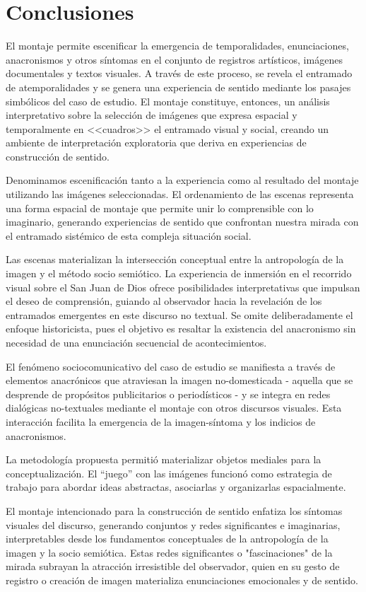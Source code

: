 \section{Conclusiones}

El montaje permite escenificar la emergencia de temporalidades, enunciaciones, anacronismos y otros síntomas en el conjunto de registros artísticos, imágenes documentales y textos visuales. A través de este proceso, se revela el entramado de atemporalidades y se genera una experiencia de sentido mediante los pasajes simbólicos del caso de estudio. El montaje constituye, entonces, un análisis interpretativo sobre la selección de imágenes que expresa espacial y temporalmente en <<cuadros>> el entramado visual y social, creando un ambiente de interpretación exploratoria que deriva en experiencias de construcción de sentido.

Denominamos escenificación tanto a la experiencia como al resultado del montaje utilizando las imágenes seleccionadas. El ordenamiento de las escenas representa una forma espacial de montaje que permite unir lo comprensible con lo imaginario, generando experiencias de sentido que confrontan nuestra mirada con el entramado sistémico de esta compleja situación social.

Las escenas materializan la intersección conceptual entre la antropología de la imagen y el método socio semiótico. La experiencia de inmersión en el recorrido visual sobre el San Juan de Dios ofrece posibilidades interpretativas que impulsan el deseo de comprensión, guiando al observador hacia la revelación de los entramados emergentes en este discurso no textual. Se omite deliberadamente el enfoque historicista, pues el objetivo es resaltar la existencia del anacronismo sin necesidad de una enunciación secuencial de acontecimientos.

El fenómeno sociocomunicativo del caso de estudio se manifiesta a través de elementos anacrónicos que atraviesan la imagen no-domesticada - aquella que se desprende de propósitos publicitarios o periodísticos - y se integra en redes dialógicas no-textuales mediante el montaje con otros discursos visuales. Esta interacción facilita la emergencia de la imagen-síntoma y los indicios de anacronismos.

La metodología propuesta permitió materializar objetos mediales para la conceptualización. El ``juego'' con las imágenes funcionó como estrategia de trabajo para abordar ideas abstractas, asociarlas y organizarlas espacialmente.

El montaje intencionado para la construcción de sentido enfatiza los síntomas visuales del discurso, generando conjuntos y redes significantes e imaginarias, interpretables desde los fundamentos conceptuales de la antropología de la imagen y la socio semiótica. Estas redes significantes o "fascinaciones" de la mirada subrayan la atracción irresistible del observador, quien en su gesto de registro o creación de imagen materializa enunciaciones emocionales y de sentido.

